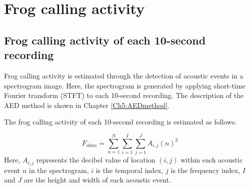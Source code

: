 \section{Frog calling activity}

\subsection{Frog calling activity of each 10-second recording}
Frog calling activity is estimated through the detection of acoustic events in a spectrogram image. Here, the spectrogram is generated by applying short-time Fourier transform (STFT) to each 10-second recording. The description of the AED method is shown in Chapter \ref{Ch5:AEDmethod}.



The frog calling activity of each 10-second recording is estimated as follows.

\begin{equation}
F_{abun} = \sum_{n=1}^{N}\sum_{i=1}^{I}\sum_{j=1}^{J} A_{i,j}(n)^2
\end{equation}
Here, $A_{i,j}$ represents the decibel value of location $(i,j)$ within each acoustic event $n$ in the spectrogram, $i$ is the temporal index, $j$ is the frequency index, $I$ and $J$ are the height and width of each acoustic event.

